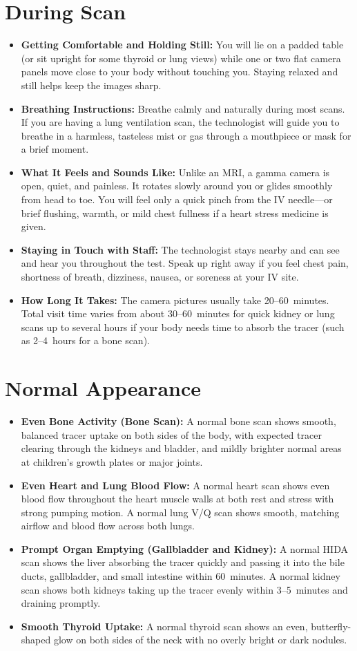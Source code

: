 \section{During Scan}
\begin{itemize}
\item \textbf{Getting Comfortable and Holding Still:} You will lie on a padded table (or sit upright for some thyroid or lung views) while one or two flat camera panels move close to your body without touching you. Staying relaxed and still helps keep the images sharp.
\item \textbf{Breathing Instructions:} Breathe calmly and naturally during most scans. If you are having a lung ventilation scan, the technologist will guide you to breathe in a harmless, tasteless mist or gas through a mouthpiece or mask for a brief moment.
\item \textbf{What It Feels and Sounds Like:} Unlike an MRI, a gamma camera is open, quiet, and painless. It rotates slowly around you or glides smoothly from head to toe. You will feel only a quick pinch from the IV needle---or brief flushing, warmth, or mild chest fullness if a heart stress medicine is given.
\item \textbf{Staying in Touch with Staff:} The technologist stays nearby and can see and hear you throughout the test. Speak up right away if you feel chest pain, shortness of breath, dizziness, nausea, or soreness at your IV site.
\item \textbf{How Long It Takes:} The camera pictures usually take 20--60~minutes. Total visit time varies from about 30--60~minutes for quick kidney or lung scans up to several hours if your body needs time to absorb the tracer (such as 2--4~hours for a bone scan).
\end{itemize}

\section{Normal Appearance}
\begin{itemize}
\item \textbf{Even Bone Activity (Bone Scan):} A normal bone scan shows smooth, balanced tracer uptake on both sides of the body, with expected tracer clearing through the kidneys and bladder, and mildly brighter normal areas at children's growth plates or major joints.
\item \textbf{Even Heart and Lung Blood Flow:} A normal heart scan shows even blood flow throughout the heart muscle walls at both rest and stress with strong pumping motion. A normal lung V/Q scan shows smooth, matching airflow and blood flow across both lungs.
\item \textbf{Prompt Organ Emptying (Gallbladder and Kidney):} A normal HIDA scan shows the liver absorbing the tracer quickly and passing it into the bile ducts, gallbladder, and small intestine within 60~minutes. A normal kidney scan shows both kidneys taking up the tracer evenly within 3--5~minutes and draining promptly.
\item \textbf{Smooth Thyroid Uptake:} A normal thyroid scan shows an even, butterfly-shaped glow on both sides of the neck with no overly bright or dark nodules.
\end{itemize}

